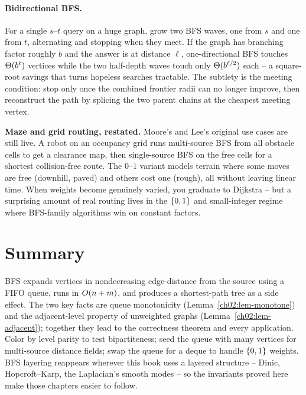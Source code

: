 \paragraph{Bidirectional BFS.}
For a single $s$--$t$ query on a huge graph, grow two BFS waves, one from $s$ and
one from $t$, alternating and stopping when they meet. If the graph has branching
factor roughly $b$ and the answer is at distance $\ell$, one-directional BFS
touches $\Theta(b^\ell)$ vertices while the two half-depth waves touch only
$\Theta(b^{\ell/2})$ each -- a square-root savings that turns hopeless searches
tractable. The subtlety is the meeting condition: stop only once the combined
frontier radii can no longer improve, then reconstruct the path by splicing the
two parent chains at the cheapest meeting vertex.

\begin{applicationbox}
\textbf{Maze and grid routing, restated.} Moore's and Lee's original use cases
are still live. A robot on an occupancy grid runs multi-source BFS from all
obstacle cells to get a clearance map, then single-source BFS on the free cells
for a shortest collision-free route. The $0$--$1$ variant models terrain where
some moves are free (downhill, paved) and others cost one (rough), all without
leaving linear time. When weights become genuinely varied, you graduate to
Dijkstra -- but a surprising amount of real routing lives in the $\{0,1\}$ and
small-integer regime where BFS-family algorithms win on constant factors.
\end{applicationbox}

\section{Summary}
\label{ch02:summary}

BFS expands vertices in nondecreasing edge-distance from the source using a FIFO
queue, runs in $O(n+m)$, and produces a shortest-path tree as a side effect.
The two key facts are queue monotonicity
(Lemma~\ref{ch02:lem-monotone}) and the adjacent-level property of unweighted
graphs (Lemma~\ref{ch02:lem-adjacent}); together they lead to the correctness
theorem and every application. Color by level parity to test bipartiteness; seed
the queue with many vertices for multi-source distance fields; swap the queue for
a deque to handle $\{0,1\}$ weights. BFS layering reappears wherever this book
uses a layered structure -- Dinic, Hopcroft--Karp, the Laplacian's smooth modes --
so the invariants proved here make those chapters easier to follow.

